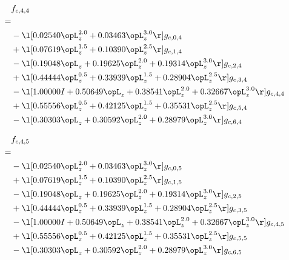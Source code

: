 \begin{alignat}{2} 
\label{eq:f_44_0} 
& f_{c,4,4} \nonumber \\ 
 = \\ 
& - \l[  0.02540 \opL_z^{2.0} +  0.03463 \opL_z^{3.0}  \r] g_{c,0,4} \nonumber \\ 
& + \l[  0.07619 \opL_z^{1.5} +  0.10390 \opL_z^{2.5}  \r] g_{c,1,4} \nonumber \\ 
& - \l[  0.19048 \opL_z +  0.19625 \opL_z^{2.0} +  0.19314 \opL_z^{3.0}  \r] g_{c,2,4} \nonumber \\ 
& + \l[  0.44444 \opL_z^{0.5} +  0.33939 \opL_z^{1.5} +  0.28904 \opL_z^{2.5}  \r] g_{c,3,4} \nonumber \\ 
& - \l[  1.00000 I +  0.50649 \opL_z +  0.38541 \opL_z^{2.0} +  0.32667 \opL_z^{3.0}  \r] g_{c,4,4} \nonumber \\ 
& + \l[  0.55556 \opL_z^{0.5} +  0.42125 \opL_z^{1.5} +  0.35531 \opL_z^{2.5}  \r] g_{c,5,4} \nonumber \\ 
& - \l[  0.30303 \opL_z +  0.30592 \opL_z^{2.0} +  0.28979 \opL_z^{3.0}  \r] g_{c,6,4} \nonumber \\ 
\end{alignat} 


\begin{alignat}{2} 
\label{eq:f_45_0} 
& f_{c,4,5} \nonumber \\ 
 = \\ 
& - \l[  0.02540 \opL_z^{2.0} +  0.03463 \opL_z^{3.0}  \r] g_{c,0,5} \nonumber \\ 
& + \l[  0.07619 \opL_z^{1.5} +  0.10390 \opL_z^{2.5}  \r] g_{c,1,5} \nonumber \\ 
& - \l[  0.19048 \opL_z +  0.19625 \opL_z^{2.0} +  0.19314 \opL_z^{3.0}  \r] g_{c,2,5} \nonumber \\ 
& + \l[  0.44444 \opL_z^{0.5} +  0.33939 \opL_z^{1.5} +  0.28904 \opL_z^{2.5}  \r] g_{c,3,5} \nonumber \\ 
& - \l[  1.00000 I +  0.50649 \opL_z +  0.38541 \opL_z^{2.0} +  0.32667 \opL_z^{3.0}  \r] g_{c,4,5} \nonumber \\ 
& + \l[  0.55556 \opL_z^{0.5} +  0.42125 \opL_z^{1.5} +  0.35531 \opL_z^{2.5}  \r] g_{c,5,5} \nonumber \\ 
& - \l[  0.30303 \opL_z +  0.30592 \opL_z^{2.0} +  0.28979 \opL_z^{3.0}  \r] g_{c,6,5} \nonumber \\ 
\end{alignat} 


